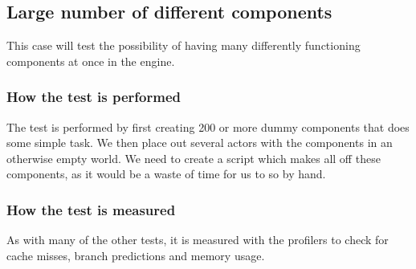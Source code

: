 \subsection{Large number of different components}
This case will test the possibility of having many differently functioning components at once in the engine. 

\subsubsection*{How the test is performed}
The test is performed by first creating 200 or more dummy components that does some simple task. 
We then place out several actors with the components in an otherwise empty world.
We need to create a script which makes all off these components, as it would be a waste of time for us to so by hand.

\subsubsection*{How the test is measured}
As with many of the other tests, it is measured with the profilers to check for cache misses, branch predictions and memory usage.
